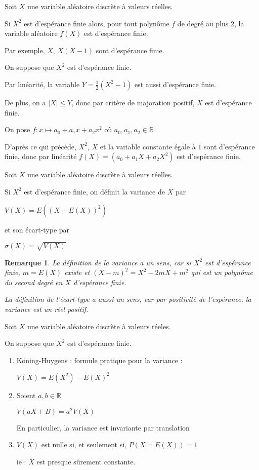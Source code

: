 \documentclass[a4paper,12pt]{book}
\newcommand{\Def}[2]{\begin{tcolorbox}[sharp corners, colback=white,colframe=blue!90!black!75, title=Définition : #1]#2\end{tcolorbox}}
\newcommand{\Prop}[2]{\begin{tcolorbox}[sharp corners, colback=white,colframe=red!90!black!75, title=Proposition : #1]#2\end{tcolorbox}}
\newcommand{\Pre}[1]{\begin{tcolorbox}[sharp corners, colback=white,colframe=green!60!green!30!black!75, title=Preuve]#1\end{tcolorbox}}
\newtheorem{Rem}{Remarque}[section]
\def\R{\mathbb{R}}
\begin{document}
\Prop{}{Soit $X$ une variable aléatoire discrète à valeurs réelles.
\par Si $X^2$ est d'espérance finie alors, pour tout polynôme $f$ de degré au plus 2, la variable aléatoire $f(X)$ est d'espérance finie.
\par Par exemple, $X$, $X(X-1)$ sont d'espérance finie.}
\Pre{On suppose que $X^2$ est d'espérance finie.
\par Par linéarité, la variable $Y=\frac{1}{2}(X^2-1)$ est aussi d'espérance finie.
\par De plus, on a $\vert X\vert\leq Y$, donc par critère de majoration positif, $X$ est d'espérance finie.
\par On pose $f:x\mapsto a_0+a_1x+a_2x^2$ où $a_0,a_1,a_2\in\R$
\par D'après ce qui précède, $X^2$, $X$ et la variable constante égale à $1$ sont d'espérance finie, donc par linéarité $f(X)=(a_0+a_1X+a_2X^2)$ est d'espérance finie.}
\Def{Variance et ecart-type}{Soit $X$ une variable aléatoire discrète à valeurs réelles.
\par Si $X^2$ est d'espérance finie, on définit la variance de $X$ par \par\begin{center}$V(X)=E((X-E(X))^2)$\end{center}
\par et son écart-type par \par\begin{center}$\sigma(X)=\sqrt{V(X)}$\end{center}}
\begin{Rem}
La définition de la variance a un sens, car si $X^2$ est d'espérance finie, $m=E(X)$ existe et $(X-m)^2= X^2-2mX + m^2$ qui est un polynôme du second degré en $X$ d'espérance finie.
\par La définition de l'écart-type a aussi un sens, car par positivité de l'espérance, la variance est un réel positif.
\end{Rem}
\Prop{de la variance}{Soit $X$ une variable aléatoire discrète à valeurs réeles.
\par On suppose que $X^2$ est d'espérance finie.\begin{enumerate}
\item Köning-Huygens : formule pratique pour la variance :\par\begin{center}$V(X)=E(X^2)-E(X)^2$\end{center}
\item Soient $a,b\in\R$ \par\begin{center}$V(aX+B)=a^2V(X)$\end{center} \par En particulier, la variance est invariante par translation
\item $V(X)$ est nulle si, et seulement si, $P(X=E(X))=1$ \par ie : $X$ est presque sûrement constante.
\end{enumerate}}
\end{document}
